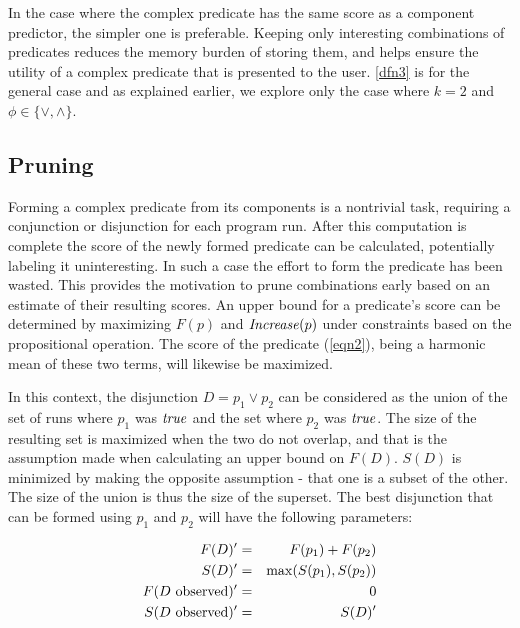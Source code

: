 In the case where the complex predicate has the same score as a component predictor, the simpler one is preferable.  Keeping only interesting combinations of predicates reduces the memory burden of storing them, and helps ensure the utility of a complex predicate that is presented to the user.  \autoref{dfn3} is for the general case and as explained earlier, we explore only the case where $k = 2$ and $\phi \in \{\vee, \wedge\}$.

\subsection{Pruning}
\label{sec-pruning}
Forming a complex predicate from its components is a nontrivial task, requiring a conjunction or disjunction for each program run.  After this computation is complete the score of the newly formed predicate can be calculated, potentially labeling it uninteresting.  In such a case the effort to form the predicate has been wasted.  This provides the motivation to prune combinations early based on an estimate of their resulting scores.  An upper bound for a predicate's score can be determined by maximizing $F(p)$ and $\mathit{Increase}(p)$ under constraints based on the propositional operation.  The score of the predicate (\autoref{eqn2}), being a harmonic mean of these two terms, will likewise be maximized.

In this context, the disjunction $D = p_1 \vee p_2$ can be considered as the union of the set of runs where $p_1$ was $\mathit{true}$ and the set where $p_2$ was $\mathit{true}$.  The size of the resulting set is maximized when the two do not overlap, and that is the assumption made when calculating an upper bound on $F(D)$.  $S(D)$ is minimized by making the opposite assumption - that one is a subset of the other.  The size of the union is thus the size of the superset.  The best disjunction that can be formed using $p_1$ and $p_2$ will have the following parameters:

\begin{eqnarray*}
  F(D)' &=&  F(p_1) + F(p_2) \\
  S(D)' &=&  \max(S(p_1),S(p_2)) \\
  F(\text{$D$ observed})' &=& 0 \\
  S(\text{$D$ observed})' &=& S(D)'
\end{eqnarray*}

